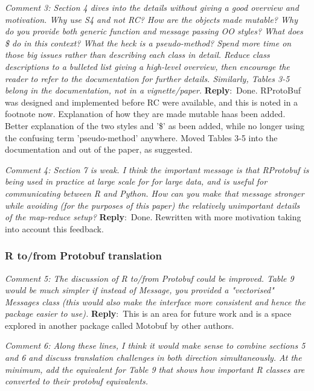 \documentclass[10pt]{article}
\newcommand{\pointRaised}[2]{\smallskip %
  \textsl{{\fontseries{b}\selectfont #1}: #2}\newline}
\newcommand{\reply}[1]{\textbf{Reply}:\ #1 \smallskip } %
\begin{document}
\pointRaised{Comment 3}{Section 4 dives into the details without giving a good overview and
  motivation. Why use S4 and not RC? How are the objects made mutable?
  Why do you provide both generic function and message passing OO
  styles? What does \$ do in this context? What the heck is a
  pseudo-method? Spend more time on those big issues rather than
  describing each class in detail. Reduce class descriptions to a
  bulleted list giving a high-level overview, then encourage the reader
  to refer to the documentation for further details. Similarly, Tables
  3-5 belong in the documentation, not in a vignette/paper.}
\reply{Done. RProtoBuf was designed and implemented before RC were
  available, and this is noted in a footnote now.  Explanation of how
  they are made mutable haas been added.  Better explanation of the
  two styles and '\$' as been added, while no longer using the
  confusing term
  'pseudo-method' anywhere.  Moved Tables 3-5 into the documentation
  and out of the paper, as suggested.}

\pointRaised{Comment 4}{Section 7 is weak. I think the important message is that RProtobuf is
  being used in practice at large scale for for large data, and is
  useful for communicating between R and Python. How can you make that
  message stronger while avoiding (for the purposes of this paper) the
  relatively unimportant details of the map-reduce setup?}
\reply{Done.  Rewritten with more motivation taking into account this feedback.}

\subsubsection*{R to/from Protobuf translation}

\pointRaised{Comment 5}{The discussion of R to/from Protobuf could be improved. Table 9 would be
  much simpler if instead of Message, you provided a "vectorised"
  Messages class (this would also make the interface more consistent and
  hence the package easier to use).}
\reply{This is an area for future work and is a space explored in
  another package called Motobuf by other authors.}

\pointRaised{Comment 6}{Along these lines, I think it would make sense to combine sections 5
  and 6 and discuss translation challenges in both direction
  simultaneously. At the minimum, add the equivalent for Table 9 that
  shows how important R classes are converted to their protobuf
  equivalents.}
\end{document}
